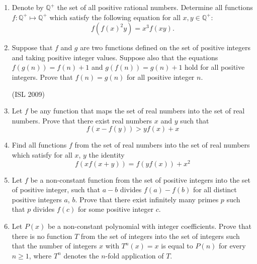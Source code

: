 \documentclass[11pt,a4paper]{article}
\begin{document}
\begin{enumerate}
(ISL 2010)
\item Denote by $\mathbb{Q}^+$ the set of all positive rational numbers. Determine all functions $f : \mathbb{Q}^+ \mapsto \mathbb{Q}^+$ which satisfy the following equation for all $x, y \in \mathbb{Q}^+:$ \[f\left( f(x)^2y \right) = x^3 f(xy).\]

\item Suppose that $f$ and $g$ are two functions defined on the set of positive integers and taking positive integer values. Suppose also that the equations $f(g(n)) = f(n) + 1$ and $g(f(n)) = g(n) + 1$ hold for all positive integers. Prove that $f(n) = g(n)$ for all positive integer $n.$

(ISL 2009)
\item Let $f$ be any function that maps the set of real numbers into the set of real numbers. Prove that there exist real numbers $x$ and $y$ such that \[f\left(x-f(y)\right)>yf(x)+x\]

\item Find all functions $f$ from the set of real numbers into the set of real numbers which satisfy for all $x$, $y$ the identity \[ f\left(xf(x+y)\right) = f\left(yf(x)\right) +x^2\]

\item Let $f$ be a non-constant function from the set of positive integers into the set of positive integer, such that $a-b$ divides $f(a)-f(b)$ for all distinct positive integers $a$, $b$. Prove that there exist infinitely many primes $p$ such that $p$ divides $f(c)$ for some positive integer $c$.

\item Let $P(x)$ be a non-constant polynomial with integer coefficients. Prove that there is no function $T$ from the set of integers into the set of integers such that the number of integers $x$ with $T^n(x)=x$ is equal to $P(n)$ for every $n\geq 1$, where $T^n$ denotes the $n$-fold application of $T$.

\end{enumerate}
\end{document}
